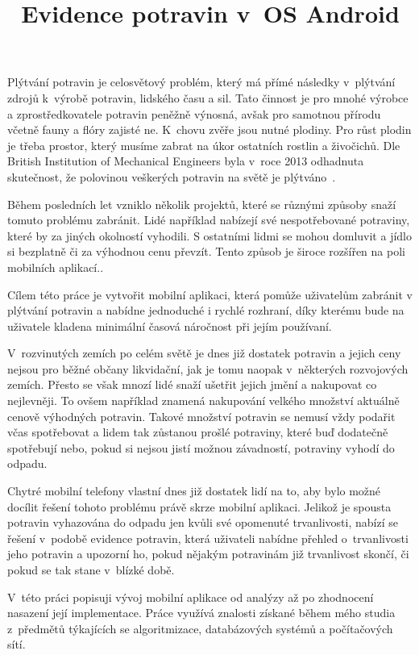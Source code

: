 \documentclass[thesis=B,czech]{FITthesis}[2013/10/20]
\title{Evidence potravin v~OS Android}
\begin{document}
\sloppy


\begin{introduction}

Plýtvání potravin je celosvětový problém, který má přímé následky v~plýtvání zdrojů k~výrobě potravin, lidského času a sil. Tato činnost je pro mnohé výrobce a zprostředkovatele potravin peněžně výnosná, avšak pro samotnou přírodu včetně fauny a flóry zajisté ne. K~chovu zvěře jsou nutné plodiny. Pro růst plodin je třeba prostor, který musíme zabrat na úkor ostatních rostlin a živočichů. Dle British Institution of Mechanical Engineers byla v~roce 2013 odhadnuta skutečnost, že polovinou veškerých potravin na světě je plýtváno~\cite{fakta}.

Během posledních let vzniklo několik projektů, které se různými způsoby snaží tomuto problému zabránit. Lidé například nabízejí své nespotřebované potraviny, které by za jiných okolností vyhodili. S ostatními lidmi se mohou domluvit a jídlo si bezplatně či za výhodnou cenu převzít. Tento způsob je široce rozšířen na poli mobilních aplikací..

Cílem této práce je vytvořit mobilní aplikaci, která pomůže uživatelům zabránit v plýtvání potravin a nabídne jednoduché i rychlé rozhraní, díky kterému bude na uživatele kladena minimální časová náročnost při jejím používaní.

V~rozvinutých zemích po celém světě je dnes již dostatek potravin a jejich ceny nejsou pro běžné občany likvidační, jak je tomu naopak v~některých rozvojových zemích. Přesto se však mnozí lidé snaží ušetřit jejich jmění a nakupovat co nejlevněji. To ovšem například znamená nakupování velkého množství aktuálně cenově výhodných potravin. Takové množství potravin se nemusí vždy podařit včas spotřebovat a lidem tak zůstanou prošlé potraviny, které buď dodatečně spotřebují nebo, pokud si nejsou jistí možnou závadností, potraviny vyhodí do odpadu.

Chytré mobilní telefony vlastní dnes již dostatek lidí na to, aby bylo možné docílit řešení tohoto problému právě skrze mobilní aplikaci. Jelikož je spousta potravin vyhazována do odpadu jen kvůli své opomenuté trvanlivosti, nabízí se řešení v~podobě evidence potravin, která uživateli nabídne přehled o~trvanlivosti jeho potravin a upozorní ho, pokud nějakým potravinám již trvanlivost skončí, či pokud se tak stane v~blízké době.

V~této práci popisuji vývoj mobilní aplikace od analýzy až po zhodnocení nasazení její implementace. Práce využívá znalosti získané během mého studia z~předmětů týkajících se algoritmizace, databázových systémů a počítačových sítí.

\end{introduction}
\end{document}
